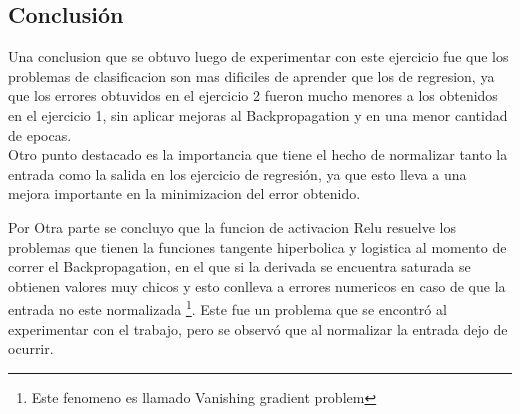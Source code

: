 \subsection{Conclusión}
Una conclusion que se obtuvo luego de experimentar con este ejercicio fue que los problemas de clasificacion son mas dificiles de aprender que los de regresion, ya que
los errores obtuvidos en el ejercicio 2 fueron mucho menores a los obtenidos en el ejercicio 1, sin aplicar mejoras al Backpropagation y en una menor cantidad de epocas. \\
Otro punto destacado es la importancia que tiene el hecho de normalizar tanto la entrada como la salida en los ejercicio de regresión, ya que esto lleva a una mejora importante
en la minimizacion del error obtenido.

Por Otra parte se concluyo que la funcion de activacion Relu resuelve los problemas que tienen la funciones tangente hiperbolica y logistica al momento de correr el Backpropagation,
en el que si la derivada se encuentra saturada se obtienen valores muy chicos y esto conlleva a errores numericos en caso de que la entrada no este normalizada \footnote{Este fenomeno es llamado Vanishing gradient problem}. Este fue un problema
que se encontró al experimentar con el trabajo, pero se observó que al normalizar la entrada dejo de ocurrir. 

\newpage
